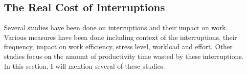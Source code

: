 \documentclass[11pt,singleside]{myfithesis2}
\begin{document}


		\subsection{The Real Cost of Interruptions }
Several studies \cite{studySpeedAndStress, studyAttention, studyDealingWithInterruptions, studyResumptionStrategies} have been done on interruptions and their impact on work. Various measures have been done including context of the interruptions, their frequency, impact on work efficiency, stress level, workload and effort. Other studies focus on the amount of productivity time wasted by these interruptions. In this section, I will mention several of these studies.
\end{document}
